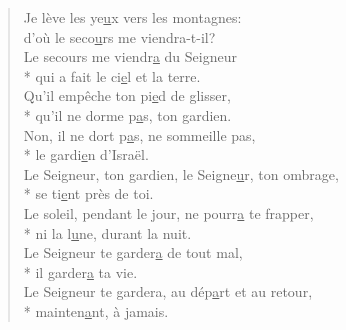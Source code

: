 \begin{verse}

Je lève les ye\underline{u}x vers les montagnes: \\
d’où le seco\underline{u}rs me viendra-t-il? \\
Le secours me viendr\underline{a} du Seigneur \\*
qui a fait le ci\underline{e}l et la terre. \\

Qu’il empêche ton pi\underline{e}d de glisser, \\*
qu’il ne dorme p\underline{a}s, ton gardien. \\
Non, il ne dort p\underline{a}s, ne sommeille pas, \\*
le gardi\underline{e}n d’Israël. \\

Le Seigneur, ton gardien, le Seigne\underline{u}r, ton ombrage, \\*
se ti\underline{e}nt près de toi. \\
Le soleil, pendant le jour, ne pourr\underline{a} te frapper, \\*
ni la l\underline{u}ne, durant la nuit. \\

Le Seigneur te garder\underline{a} de tout mal, \\*
il garder\underline{a} ta vie. \\
Le Seigneur te gardera, au dép\underline{a}rt et au retour, \\*
mainten\underline{a}nt, à jamais. \\
\end{verse}

